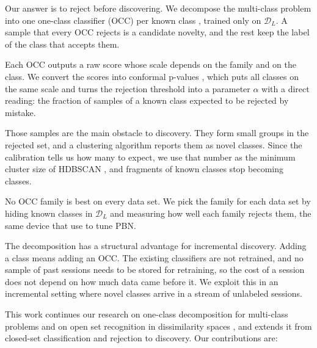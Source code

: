 \documentclass[pdflatex,sn-basic]{sn-jnl}
\newcommand{\DL}{\mathcal{D}_L}
\begin{document}
Our answer is to reject before discovering. We decompose the multi-class problem into one one-class classifier (OCC) per known class \citep{tax2004svdd,khan2014occ}, trained only on $\DL$. A sample that every OCC rejects is a candidate novelty, and the rest keep the label of the class that accepts them.

Each OCC outputs a raw score whose scale depends on the family and on the class. We convert the scores into conformal p-values \citep{vovk2005alrw,bates2023conformal}, which puts all classes on the same scale and turns the rejection threshold into a parameter $\alpha$ with a direct reading: the fraction of samples of a known class expected to be rejected by mistake.

Those samples are the main obstacle to discovery. They form small groups in the rejected set, and a clustering algorithm reports them as novel classes. Since the calibration tells us how many to expect, we use that number as the minimum cluster size of HDBSCAN \citep{campello2013hdbscan}, and fragments of known classes stop becoming classes.

No OCC family is best on every data set. We pick the family for each data set by hiding known classes in $\DL$ and measuring how well each family rejects them, the same device that \citet{troisemaine2024pbn} use to tune PBN.

The decomposition has a structural advantage for incremental discovery. Adding a class means adding an OCC. The existing classifiers are not retrained, and no sample of past sessions needs to be stored for retraining, so the cost of a session does not depend on how much data came before it. We exploit this in an incremental setting where novel classes arrive in a stream of unlabeled sessions.

This work continues our research on one-class decomposition for multi-class problems \citep{fragoso2021modes} and on open set recognition in dissimilarity spaces \citep{teixeira2025osr}, and extends it from closed-set classification and rejection to discovery. Our contributions are:
\end{document}
